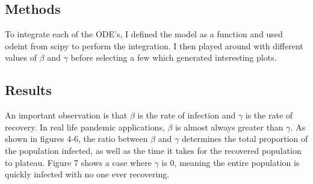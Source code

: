 \documentclass{article}
\begin{document}
\subsection{Methods}

To integrate each of the ODE's, I defined the model as a function and used odeint from scipy to perform the integration. I then played around with different values of $\beta$ and $\gamma$ before selecting a few which generated interesting plots.

\subsection{Results}
An important observation is that $\beta$ is the rate of infection and $\gamma$ is the rate of recovery. In real life pandemic applications, $\beta$ is almost always greater than $\gamma$. As shown in figures 4-6, the ratio between $\beta$ and $\gamma$ determines the total proportion of the population infected, as well as the time it takes for the recovered population to plateau. Figure 7 shows a case where $\gamma$ is 0, meaning the entire population is quickly infected with no one ever recovering.
\end{document}
